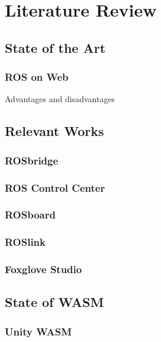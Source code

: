\chapter{Literature Review}\label{cha:literature}

\section{State of the Art}\label{sec:state}

    \subsection{ROS on Web}\label{sub:ros_on_web}

    Advantages and disadvantages


\section{Relevant Works}

    \subsection{ROSbridge}

    \subsection{ROS Control Center}

    \subsection{ROSboard}

    \subsection{ROSlink}

    \subsection{Foxglove Studio}

\section{State of WASM}

    \subsection{Unity WASM}
